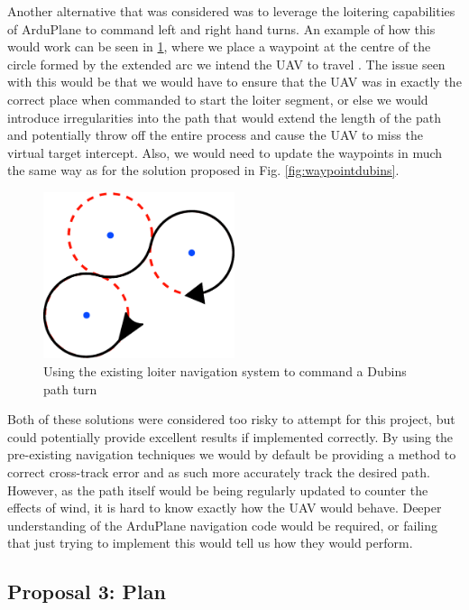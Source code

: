Another alternative that was considered was to leverage the loitering capabilities of ArduPlane to command left and right hand turns. An example of how this would work can be seen in \ref{fig:loiterdubins}, where we place a waypoint at the centre of the circle formed by the extended arc we intend the UAV to travel . The issue seen with this would be that we would have to ensure that the UAV was in exactly the correct place when commanded to start the loiter segment, or else we would introduce irregularities into the path that would extend the length of the path and potentially throw off the entire process and cause the UAV to miss the virtual target intercept. Also, we would need to update the waypoints in much the same way as for the solution proposed in Fig. \ref{fig:waypointdubins}.

\begin{figure}[htbp!] 
\centering    
\includegraphics[width=0.5\textwidth]{LoiterDubins}
\caption[Commanding a Dubins path turn using loiter navigation]{Using the existing loiter navigation system to command a Dubins path turn}
\label{fig:loiterdubins}
\end{figure} 

Both of these solutions were considered too risky to attempt for this project, but could potentially provide excellent results if implemented correctly. By using the pre-existing navigation techniques we would by default be providing a method to correct cross-track error and as such more accurately track the desired path. However, as the path itself would be being regularly updated to counter the effects of wind, it is hard to know exactly how the UAV would behave. Deeper understanding of the ArduPlane navigation code would be required, or failing that just trying to implement this would tell us how they would perform.  

\subsection{Proposal 3: Plan} 
\label{future:alternatedubinsplan}

